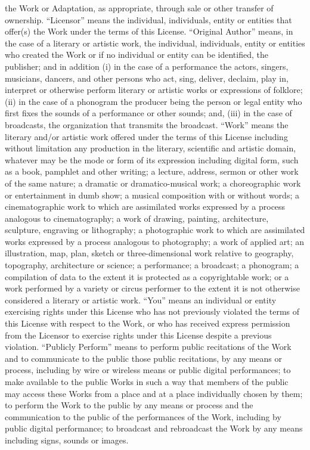 \documentclass[oneside]{book}
\begin{document}
the Work or Adaptation, as appropriate, through sale or other transfer of
ownership.
``Licensor'' means the individual, individuals, entity or entities that offer(s)
the Work under the terms of this License.
``Original Author'' means, in the case of a literary or artistic work, the
individual, individuals, entity or entities who created the Work or if no
individual or entity can be identified, the publisher; and in addition (i) in
the case of a performance the actors, singers, musicians, dancers, and other
persons who act, sing, deliver, declaim, play in, interpret or otherwise perform
literary or artistic works or expressions of folklore; (ii) in the case of a
phonogram the producer being the person or legal entity who first fixes the
sounds of a performance or other sounds; and, (iii) in the case of broadcasts,
the organization that transmits the broadcast.
``Work'' means the literary and/or artistic work offered under the terms of this
License including without limitation any production in the literary, scientific
and artistic domain, whatever may be the mode or form of its expression
including digital form, such as a book, pamphlet and other writing; a lecture,
address, sermon or other work of the same nature; a dramatic or
dramatico-musical work; a choreographic work or entertainment in dumb show; a
musical composition with or without words; a cinematographic work to which are
assimilated works expressed by a process analogous to cinematography; a work of
drawing, painting, architecture, sculpture, engraving or lithography; a
photographic work to which are assimilated works expressed by a process
analogous to photography; a work of applied art; an illustration, map, plan,
sketch or three-dimensional work relative to geography, topography, architecture
or science; a performance; a broadcast; a phonogram; a compilation of data to
the extent it is protected as a copyrightable work; or a work performed by a
variety or circus performer to the extent it is not otherwise considered a
literary or artistic work.
``You'' means an individual or entity exercising rights under this License who
has not previously violated the terms of this License with respect to the Work,
or who has received express permission from the Licensor to exercise rights
under this License despite a previous violation.
``Publicly Perform'' means to perform public recitations of the Work and to
communicate to the public those public recitations, by any means or process,
including by wire or wireless means or public digital performances; to make
available to the public Works in such a way that members of the public may
access these Works from a place and at a place individually chosen by them; to
perform the Work to the public by any means or process and the communication to
the public of the performances of the Work, including by public digital
performance; to broadcast and rebroadcast the Work by any means including signs,
sounds or images.
\end{document}
